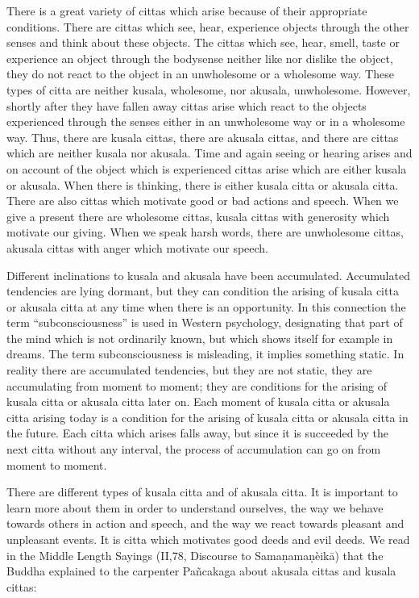 \documentclass{book}
\begin{document}
There is a great variety of cittas which arise because of their
appropriate conditions. There are cittas which see, hear, experience
objects through the other senses and think about these objects. The
cittas which see, hear, smell, taste or experience an object through the
bodysense neither like nor dislike the object, they do not react to the
object in an unwholesome or a wholesome way. These types of citta are
neither kusala, wholesome, nor akusala, unwholesome. However, shortly
after they have fallen away cittas arise which react to the objects
experienced through the senses either in an unwholesome way or in a
wholesome way. Thus, there are kusala cittas, there are akusala cittas,
and there are cittas which are neither kusala nor akusala. Time and
again seeing or hearing arises and on account of the object which is
expe­rienced cittas arise which are either kusala or akusala. When
there is thinking, there is either kusala citta or akusala citta. There
are also cittas which motivate good or bad actions and speech. When we
give a present there are wholesome cittas, kusala cittas with generosity
which motivate our giving. When we speak harsh words, there are
unwholesome cittas, akusala cittas with anger which motivate our speech.

Different inclinations to kusala and akusala have been accumulated.
Accumulated tendencies are lying dormant, but they can condition the arising of kusala citta or akusala citta at any time when there is an opportunity. In this connection the term ``subconsciousness'' is used     in West­ern psychology, designating that part of the mind which is not
ordinarily known, but which shows itself for example in dreams. The term
subconsciousness is misleading, it implies something static. In reality
there are accumulated tendencies, but they are not static, they are
accumulating from moment to moment; they are conditions for the arising
of kusala citta or akusala citta later on. Each moment of kusala citta
or akusala citta arising today is a condition for the arising of kusala
citta or akusala citta in the future. Each citta which arises falls
away, but since it is succeeded by the next citta without any interval,
the process of accumulation can go on from moment to moment.

There are different types of kusala citta and of akusala citta. It is
important to learn more about them in order to understand ourselves, the
way we behave towards others in action and speech, and the way we react
towards pleasant and unpleasant events. It is citta which motivates good
deeds and evil deeds. We read in the Middle Length Sayings (II,78, Discourse to Samaṇamaṇèikā) that the Buddha explained to the
carpenter Pañcakaga about akusala cittas and kusala cittas:
\end{document}
